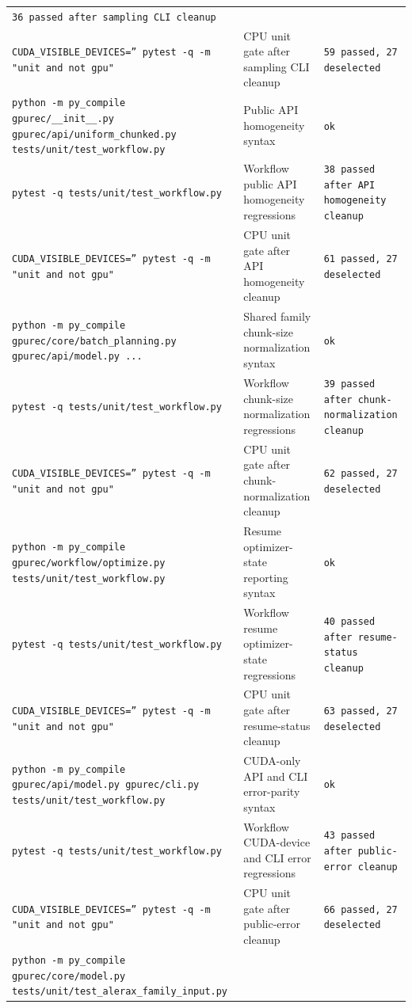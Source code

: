 \documentclass[11pt]{article}
\begin{document}
\begin{center}
\begin{tabular}{lll}
\texttt{36 passed after sampling CLI cleanup} \\
\texttt{CUDA\_VISIBLE\_DEVICES='' pytest -q -m "unit and not gpu"} &
CPU unit gate after sampling CLI cleanup &
\texttt{59 passed, 27 deselected} \\
\texttt{python -m py\_compile gpurec/\_\_init\_\_.py gpurec/api/uniform\_chunked.py tests/unit/test\_workflow.py} &
Public API homogeneity syntax &
\texttt{ok} \\
\texttt{pytest -q tests/unit/test\_workflow.py} &
Workflow public API homogeneity regressions &
\texttt{38 passed after API homogeneity cleanup} \\
\texttt{CUDA\_VISIBLE\_DEVICES='' pytest -q -m "unit and not gpu"} &
CPU unit gate after API homogeneity cleanup &
\texttt{61 passed, 27 deselected} \\
\texttt{python -m py\_compile gpurec/core/batch\_planning.py gpurec/api/model.py ...} &
Shared family chunk-size normalization syntax &
\texttt{ok} \\
\texttt{pytest -q tests/unit/test\_workflow.py} &
Workflow chunk-size normalization regressions &
\texttt{39 passed after chunk-normalization cleanup} \\
\texttt{CUDA\_VISIBLE\_DEVICES='' pytest -q -m "unit and not gpu"} &
CPU unit gate after chunk-normalization cleanup &
\texttt{62 passed, 27 deselected} \\
\texttt{python -m py\_compile gpurec/workflow/optimize.py tests/unit/test\_workflow.py} &
Resume optimizer-state reporting syntax &
\texttt{ok} \\
\texttt{pytest -q tests/unit/test\_workflow.py} &
Workflow resume optimizer-state regressions &
\texttt{40 passed after resume-status cleanup} \\
\texttt{CUDA\_VISIBLE\_DEVICES='' pytest -q -m "unit and not gpu"} &
CPU unit gate after resume-status cleanup &
\texttt{63 passed, 27 deselected} \\
\texttt{python -m py\_compile gpurec/api/model.py gpurec/cli.py tests/unit/test\_workflow.py} &
CUDA-only API and CLI error-parity syntax &
\texttt{ok} \\
\texttt{pytest -q tests/unit/test\_workflow.py} &
Workflow CUDA-device and CLI error regressions &
\texttt{43 passed after public-error cleanup} \\
\texttt{CUDA\_VISIBLE\_DEVICES='' pytest -q -m "unit and not gpu"} &
CPU unit gate after public-error cleanup &
\texttt{66 passed, 27 deselected} \\
\texttt{python -m py\_compile gpurec/core/model.py tests/unit/test\_alerax\_family\_input.py} &

\end{tabular}
\end{center}
\end{document}
